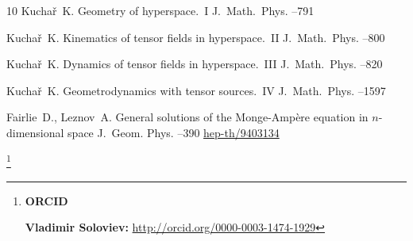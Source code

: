 \begin{thebibliography}{10}
\by Kucha\v{r}~K. 
\paper Geometry of hyperspace.~I 
\jour J.~Math.~Phys.
--791

\by Kucha\v{r}~K. 
\paper Kinematics of tensor fields in hyperspace.~II 
\jour J.~Math.~Phys.
--800

\by Kucha\v{r}~K. 
\paper Dynamics of tensor fields in hyperspace.~III 
\jour J.~Math.~Phys.
--820 

\by Kucha\v{r}~K. 
\paper Geometrodynamics with tensor sources.~IV
\jour J.~Math.~Phys.
--1597



\by Fairlie~D.,  Leznov~A.
\paper General solutions of the Monge-Amp\`ere equation in $n$-dimensional space
\jour J.~Geom. Phys.
--390 
\arxiv \href{http://arxiv.org/abs/hep-th/9403134}{hep-th/9403134}
 

\end{thebibliography}



\RuDate	

\newpage

\makeentitle

\thanks{{\bf ORCID}

{\bf Vladimir Soloviev:} \url{http://orcid.org/0000-0003-1474-1929}


}

\EngRef


